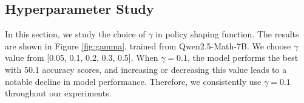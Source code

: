 \begin{table}[t]
\centering
\caption{Ablation study on LUFFY components.}
\label{tab:ablate}
\end{table}


\subsection{Hyperparameter Study}
\label{app:hyper_study}

In this section, we study the choice of $\gamma$ in policy shaping function. The results are shown in Figure \ref{fig:gamma}, trained from Qwen2.5-Math-7B. We choose $\gamma$ value from [0.05, 0.1, 0.2, 0.3, 0.5].
When $\gamma=0.1$, the model performs the best with 50.1 accuracy scores, and increasing or decreasing this value leads to a notable decline in model performance. Therefore, we consistently use $\gamma=0.1$ throughout our experiments.





